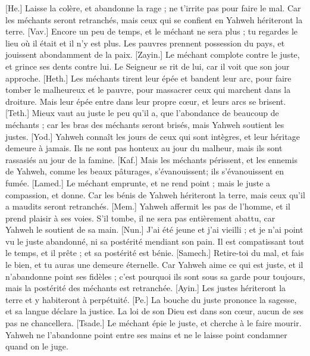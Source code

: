 \begin{multicols}{2}
[He.] Laisse la colère, et abandonne la rage ; ne t'irrite pas pour faire le mal.
Car les méchants seront retranchés, mais ceux qui se confient en Yahweh hériteront la terre.
[Vav.] Encore un peu de temps, et le méchant ne sera plus ; tu regardes le lieu où il était et il n'y est plus.
Les pauvres prennent possession du pays, et jouissent abondamment de la paix.
[Zayin.] Le méchant complote contre le juste, et grince ses dents contre lui.
Le Seigneur se rit de lui, car il voit que son jour approche.
[Heth.] Les méchants tirent leur épée et bandent leur arc, pour faire tomber le malheureux et le pauvre, pour massacrer ceux qui marchent dans la droiture.
Mais leur épée entre dans leur propre cœur, et leurs arcs se brisent.
[Teth.] Mieux vaut au juste le peu qu'il a, que l'abondance de beaucoup de méchants ;
car les bras des méchants seront brisés, mais Yahweh soutient les justes.
[Yod.] Yahweh connaît les jours de ceux qui sont intègres, et leur héritage demeure à jamais.
Ils ne sont pas honteux au jour du malheur, mais ils sont rassasiés au jour de la famine.
[Kaf.] Mais les méchants périssent, et les ennemis de Yahweh, comme les beaux pâturages, s'évanouissent; ils s'évanouissent en fumée.
[Lamed.] Le méchant emprunte, et ne rend point ; mais le juste a compassion, et donne.
Car les bénis de Yahweh hériteront la terre, mais ceux qu'il a maudits seront retranchés.
[Mem.] Yahweh affermit les pas de l'homme, et il prend plaisir à ses voies.
S'il tombe, il ne sera pas entièrement abattu, car Yahweh le soutient de sa main.
[Nun.] J'ai été jeune et j'ai vieilli ; et je n'ai point vu le juste abandonné, ni sa postérité mendiant son pain.
Il est compatissant tout le temps, et il prête ; et sa postérité est bénie.
[Samech.] Retire-toi du mal, et fais le bien, et tu auras une demeure éternelle.
Car Yahweh aime ce qui est juste, et il n'abandonne point ses fidèles ; c'est pourquoi ils sont sous sa garde pour toujours, mais la postérité des méchants est retranchée.
[Ayin.] Les justes hériteront la terre et y habiteront à perpétuité.
[Pe.] La bouche du juste prononce la sagesse, et sa langue déclare la justice.
La loi de son Dieu est dans son cœur, aucun de ses pas ne chancellera.
[Tsade.] Le méchant épie le juste, et cherche à le faire mourir.
Yahweh ne l'abandonne point entre ses mains et ne le laisse point condamner quand on le juge.

\end{multicols}
